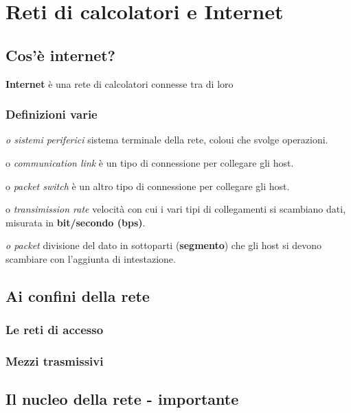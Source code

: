 \section{Reti di calcolatori e Internet}

\subsection{Cos'è internet?}
\textbf{Internet} è una rete di calcolatori connesse tra di loro

\subsubsection{Definizioni varie}
\begin{description}[font=\sffamily\bfseries, leftmargin=1cm, style=nextline]
  \item[host] 
    \textit{o sistemi periferici} sistema terminale della rete, coloui che svolge operazioni.
  \item[rete di collegamenti]
    o \textit{communication link} è un tipo di connessione per collegare gli host.
  \item[commutatori di pacchetti]
    o \textit{packet switch} è un altro tipo di connessione per collegare gli host.
  \item[velocità di trasmissione]
    o \textit{transimission rate} velocità con cui i vari tipi di collegamenti si scambiano dati, misurata in \textbf{bit/secondo (bps)}.
  \item[pacchetto]
    \textit{o packet} divisione del dato in sottoparti (\textbf{segmento}) che gli host si devono scambiare con l'aggiunta di intestazione.
  \item[asd]
\end{description}

\subsection{Ai confini della rete}
\subsubsection{Le reti di accesso}
\subsubsection{Mezzi trasmissivi}

\subsection{Il nucleo della rete - importante}
